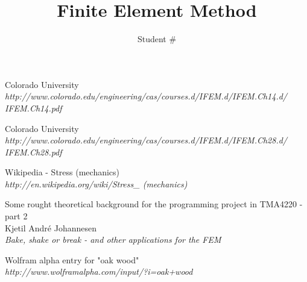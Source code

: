 \documentclass[9pt]{extarticle}
\title{Finite Element Method}
\author{Student \# }
\begin{document}
\maketitle































\begin{thebibliography}{3}

	Colorado University\\
	\emph{http://www.colorado.edu/engineering/cas/courses.d/IFEM.d/IFEM.Ch14.d/\\IFEM.Ch14.pdf}


	Colorado University\\
	\emph{http://www.colorado.edu/engineering/cas/courses.d/IFEM.d/IFEM.Ch28.d/\\IFEM.Ch28.pdf}	


Wikipedia - Stress (mechanics) \\
\emph{http://en.wikipedia.org/wiki/Stress\_ (mechanics)}

Some rought theoretical background for the programming project in TMA4220 - part 2 \\
Kjetil André Johannesen \\
\emph{Bake, shake or break - and other applications for the FEM}

	Wolfram alpha entry for "oak wood"\\
	\emph{http://www.wolframalpha.com/input/?i=oak+wood}
	



\end{thebibliography}
\end{document}

